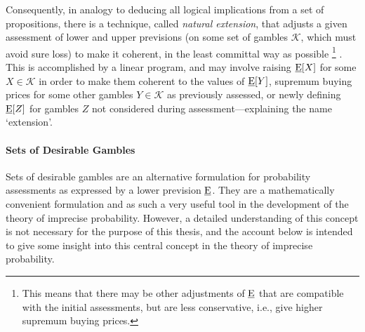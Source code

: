 Consequently, in analogy to deducing all logical implications from
a set of propositions, there is a technique, %
called \emph{natural extension}, that adjusts
a given assessment of lower and upper previsions (on some set of gambles $\mathcal{K}$, which must avoid sure loss)
to make it coherent, in the least committal way as possible%
\footnote{This means that there may be other adjustments of $\underline{\operatorname{E}}$ that are compatible
with the initial assessments, but are less conservative,
i.e., give higher supremum buying prices.}
\parencite[see, e.g.,][pp.~15ff]{1996:walley::expert}.
This is accomplished by a linear program,
and may involve raising $\underline{\operatorname{E}}[X]$ for some $X \in \mathcal{K}$ in order to make them
coherent to the values of $\underline{\operatorname{E}}[Y]$, supremum buying prices for some other gambles $Y \in \mathcal{K}$ as previously assessed,
or newly defining $\underline{\operatorname{E}}[Z]$ for gambles $Z$ not considered during assessment---explaining the name `extension'.

\paragraph{Sets of Desirable Gambles}

Sets of desirable gambles \parencites[\S 6]{2000:walley::towards}{itip-desirable} are an alternative formulation
for probability assessments as expressed by a lower prevision $\underline{\operatorname{E}}$.
They are a mathematically convenient formulation
and as such a very useful tool in the development of the theory of imprecise probability.
However, a detailed understanding of this concept is not necessary for the purpose of this thesis,
and the account below is intended to give some insight into this central concept in the theory of imprecise probability.

